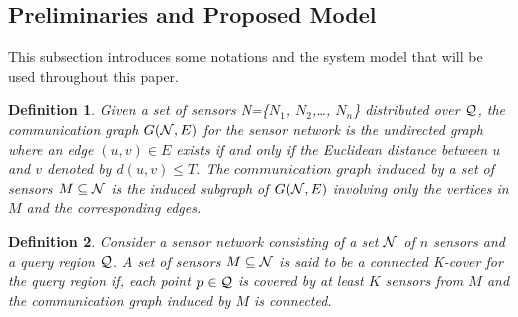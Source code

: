 \documentclass{acm_proc_article-sp}
\newtheorem{definition}{Definition}
\begin{document}
 \subsection{Preliminaries and Proposed Model}
 This subsection introduces some notations and the system model that will be used throughout this paper.
 \vspace{-0.5cm}
 
        \begin{definition} 
     Given a set of sensors {\cal N}={\{$N_1$, $N_2$,\ldots, $N_n$\}} distributed over $\cal Q$, the {\it communication graph} ${G}({\cal N},E)$ for the sensor network is the undirected graph where an edge $(u, v) \in E$ exists if and only if the Euclidean distance between $u$ and $v$ denoted by $d(u, v) \leq T$. The $communication$ $graph$ $induced$ by a set of sensors $M \subseteq \cal N$ is the induced subgraph of ${G}({\cal N},E)$ involving only the vertices in $M$ and the corresponding edges.
    \end{definition}
    \vspace{-0.7cm}
        \begin{definition}
     Consider a sensor network consisting of a set $\cal N$ of $n$ sensors and a query region $\cal Q$. A set of sensors $M \subseteq \cal N$ is said to be a {\it connected K-cover} for the query region if, each point $p\in \cal Q$ is covered by at least $K$ sensors from $M$ and the communication graph induced by $M$ is connected.
    \end{definition}
    \vspace{-0.5cm}
    
\end{document}
